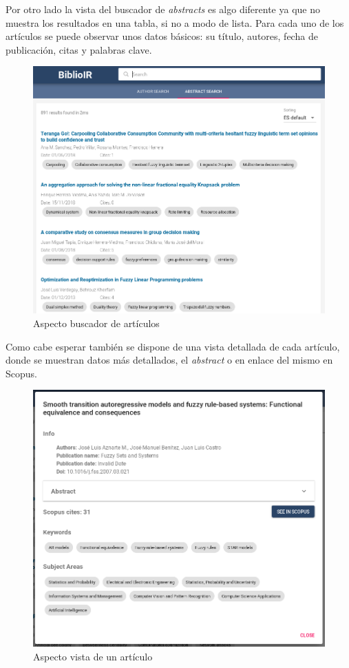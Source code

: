 \newpage

Por otro lado la vista del buscador de \textit{abstracts} es algo diferente ya que no muestra los resultados en una tabla, si no a modo de lista. Para cada uno de los artículos se puede observar unos datos básicos: su título, autores, fecha de publicación, citas y palabras clave.

\begin{figure}[h]
	
	\centering
	\includegraphics[width=\linewidth]{imagenes/AspectoBuscadorAbstracts}
	\caption{Aspecto buscador de artículos}
\end{figure}

\newpage

Como cabe esperar también se dispone de una vista detallada de cada artículo, donde se muestran datos más detallados, el \textit{abstract} o en enlace del mismo en Scopus.
\begin{figure}[h]
	
	\centering
	\includegraphics[width=\linewidth]{imagenes/AspectoVistaAbstract}
	\caption{Aspecto vista de un artículo}
\end{figure}


